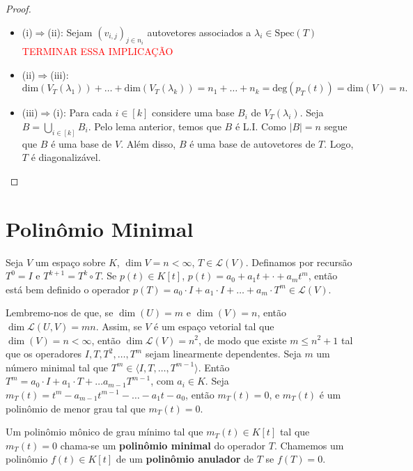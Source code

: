 \documentclass[11pt,twoside,a4paper]{book}
\begin{document}
\begin{proof}
\begin{itemize}\hfill
\item (i)$\Rightarrow$(ii): Sejam $(v_{i,j})_{j\in n_i}$ autovetores associados
  a $\lambda_i\in\text{Spec}(T)$\textcolor{red}{TERMINAR ESSA IMPLICAÇÃO}  
\item (ii)\(\Rightarrow\)(iii):\[\text{dim}(V_T(\lambda_1))+\ldots +\text{dim}(V_T(\lambda_k))=n_1+\ldots +n_k=\text{deg}(p_T(t))=\text{dim}(V)=n.\]
\item (iii)\(\Rightarrow\)(i): Para cada \(i\in [k]\) considere uma base \(B_i\)
  de \(V_T(\lambda_i)\). Seja \(B=\bigcup_{i\in [k]}B_i\). Pelo lema anterior,
  temos que \(B\) é L.I. Como \(\vert B\vert =n\) segue que \(B\) é uma base de
  \(V\). Além disso, \(B\) é uma base de autovetores de \(T\). Logo, \(T\) é diagonalizável.
\end{itemize}
\end{proof}

\section{Polinômio Minimal}

\begin{definicao}
Seja $V$ um espaço sobre $K$, $\dim V=n<\infty$, $T\in\mathcal{L}(V)$. Definamos por recursão $T^0=I$ e $T^{k+1}=T^k\circ T$. Se $p(t)\in K[t]$, $p(t)=a_0+a_1t+\cdot+a_mt^m$, então está bem definido o operador $p(T)=a_0\cdot I+a_1\cdot I+\dots+a_m\cdot T^m\in\mathcal{L}(V)$.
\end{definicao}

\noindent
Lembremo-nos de que, se $\dim(U)=m$ e $\dim(V)=n$, então $\dim\mathcal{L}(U,V)=mn$. Assim, se $V$ é um espaço vetorial tal que $\dim(V)=n<\infty$, então $\dim\mathcal{L}(V)=n^2$, de modo que existe $m\leq n^2+1$ tal que os operadores $I,T,T^2,\dots,T^m$ sejam linearmente dependentes. Seja $m$ um número minimal tal que $T^m\in\langle I,T,\dots,T^{m-1}\rangle$. Então $T^m=a_0\cdot I+a_1\cdot T+\dots a_{m-1}T^{m-1}$, com $a_i\in K$. Seja $m_T(t)=t^m-a_{m-1}t^{m-1}-\dots-a_1t-a_0$, então $m_T(t)=0$, e $m_T(t)$ é um polinômio de menor grau tal que $m_T(t)=0$.

\begin{definicao}
Um polinômio mônico de grau mínimo tal que $m_T(t)\in K[t]$ tal que $m_T(t)=0$ chama-se um \textbf{polinômio minimal} do operador $T$. Chamemos um polinômio $f(t)\in K[t]$ de um \textbf{polinômio anulador} de $T$ se $f(T)=0$.
\end{definicao}
\end{document}
